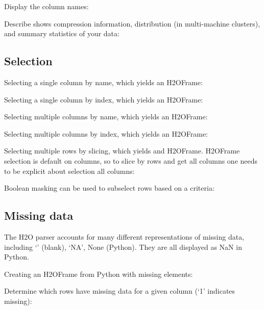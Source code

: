 Display the column names:


Describe shows compression information, distribution (in multi-machine clusters), and summary statistics of your data:
\small

\normalsize

\subsection{Selection}
Selecting a single column by name, which yields an H2OFrame:


Selecting a single column by index, which yields an H2OFrame:


Selecting multiple columns by name, which yields an H2OFrame:


Selecting multiple columns by index, which yields an H2OFrame:


Selecting multiple rows by slicing, which yields and H2OFrame.
H2OFrame selection is default on columns, so to slice by rows
and get all columns one needs to be explicit about selection all columns:


Boolean masking can be used to subselect rows based on a criteria:



\subsection{Missing data}
The H2O parser accounts for many different representations of missing data, including `' (blank),
`NA', None (Python).  They are all displayed as NaN in Python.

Creating an H2OFrame from Python with missing elements:


Determine which rows have missing data for a given column (`1' indicates missing):


